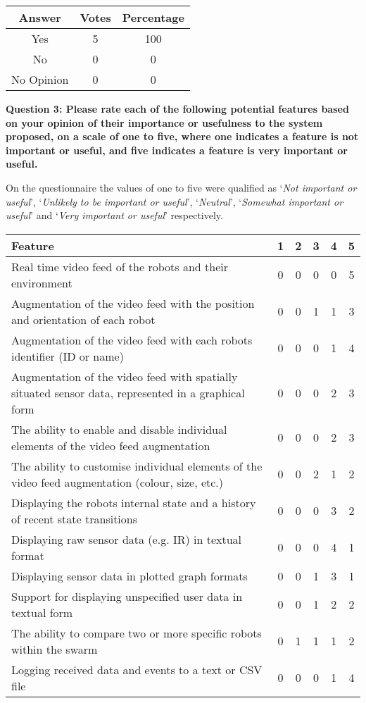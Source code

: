 \begin{center}
\begin{tabular}{ c c c }
 Answer & Votes & Percentage \\ 
 \hline
 Yes & 5 & 100 \\ 
 No & 0 & 0 \\
 No Opinion & 0 & 0 \\
\end{tabular}
\end{center}

\vspace{2cm}

\noindent\textbf{Question 3: Please rate each of the following potential features based on your opinion of their importance or usefulness to the system proposed, on a scale of one to five, where one indicates a feature is not important or useful, and five indicates a feature is very important or useful.}

On the questionnaire the values of one to five were qualified as `\textit{Not important or useful}', `\textit{Unlikely to be important or useful}', `\textit{Neutral}', `\textit{Somewhat important or useful}' and `\textit{Very important or useful}' respectively.

\begin{center}
\begin{tabular}{ p{10cm} c c c c c }
 Feature & 1 & 2 & 3 & 4 & 5 \\ 
 \hline
 Real time video feed of the robots and their environment & 0 & 0 & 0 & 0 & 5\\
 Augmentation of the video feed with the position and orientation of each robot & 0 & 0 & 1 & 1 & 3\\
 Augmentation of the video feed with each robots identifier (ID or name) & 0 & 0 & 0 & 1 & 4\\
 Augmentation of the video feed with spatially situated sensor data, represented in a graphical form & 0 & 0 & 0 & 2 & 3\\
 The ability to enable and disable individual elements of the video feed augmentation & 0 & 0 & 0 & 2 & 3\\
 The ability to customise individual elements of the video feed augmentation (colour, size, etc.) & 0 & 0 & 2 & 1 & 2\\
 Displaying the robots internal state and a history of recent state transitions & 0 & 0 & 0 & 3 & 2\\
 Displaying raw sensor data (e.g. IR) in textual format & 0 & 0 & 0 & 4 & 1\\
 Displaying sensor data in plotted graph formats & 0 & 0 & 1 & 3 & 1\\
 Support for displaying unspecified user data in textual form & 0 & 0 & 1 & 2 & 2\\
 The ability to compare two or more specific robots within the swarm & 0 & 1 & 1 & 1 & 2\\
 Logging received data and events to a text or CSV file & 0 & 0 & 0 & 1 & 4\\
\end{tabular}
\end{center}

